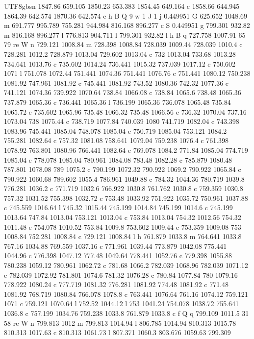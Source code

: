 \documentclass[11pt,a4paper,oneside]{report}
\begin{document}
\begin{CJK*}{UTF8}{gbsn}
{1847.86 659.105 1850.23 653.383 1854.45 649.164 c 1858.66 644.945 1864.39 642.574 1870.36 642.574 c h B Q
9 w 1 J 1 j 0.449951 G 625.652 1048.69 m 691.777 995.789 755.281 944.984 816.168 896.277 c S 0.449951 g
799.301 932.82 m 816.168 896.277 l 776.813 904.711 l 799.301 932.82 l h B q 727.758 1007.91 65 79 re W n
729.121 1008.84 m 728.398 1008.84 728.039 1009.44 728.039 1010.4 c 728.281 1012.2 728.879 1013.04 729.602
1013.04 c 732 1013.04 733.68 1013.28 734.641 1013.76 c 735.602 1014.24 736.441 1015.32 737.039 1017.12 c
750.602 1071 l 751.078 1072.44 751.441 1074.36 751.441 1076.76 c 751.441 1080.12 750.238 1081.92 747.961
1081.92 c 745.441 1081.92 743.52 1080.36 742.32 1077.36 c 741.121 1074.36 739.922 1070.64 738.84 1066.08
c 738.84 1065.6 738.48 1065.36 737.879 1065.36 c 736.441 1065.36 l 736.199 1065.36 736.078 1065.48 735.84
1065.72 c 735.602 1065.96 735.48 1066.32 735.48 1066.56 c 736.32 1070.04 737.16 1073.04 738 1075.44 c
738.719 1077.84 740.039 1080 741.719 1082.04 c 743.398 1083.96 745.441 1085.04 748.078 1085.04 c 750.719
1085.04 753.121 1084.2 755.281 1082.64 c 757.32 1081.08 758.641 1079.04 759.238 1076.4 c 761.398 1078.92
763.801 1080.96 766.441 1082.64 c 769.078 1084.2 771.84 1085.04 774.719 1085.04 c 778.078 1085.04 780.961
1084.08 783.48 1082.28 c 785.879 1080.48 787.801 1078.08 789 1075.2 c 790.199 1072.32 790.922 1069.2
790.922 1065.84 c 790.922 1060.68 789.602 1055.4 786.961 1049.88 c 784.32 1044.36 780.719 1039.8 776.281
1036.2 c 771.719 1032.6 766.922 1030.8 761.762 1030.8 c 759.359 1030.8 757.32 1031.52 755.398 1032.72 c
753.48 1033.92 751.922 1035.72 750.961 1037.88 c 745.559 1016.64 l 745.32 1015.44 745.199 1014.84 745.199
1014.6 c 745.199 1013.64 747.84 1013.04 753.121 1013.04 c 753.84 1013.04 754.32 1012.56 754.32 1011.48 c
754.078 1010.52 753.84 1009.8 753.602 1009.44 c 753.359 1009.08 753 1008.84 752.281 1008.84 c 729.121
1008.84 l h 761.879 1033.8 m 764.641 1033.8 767.16 1034.88 769.559 1037.16 c 771.961 1039.44 773.879
1042.08 775.441 1044.96 c 776.398 1047.12 777.48 1049.64 778.441 1052.76 c 779.398 1055.88 780.238
1059.12 780.961 1062.72 c 781.68 1066.2 782.039 1068.96 782.039 1071.12 c 782.039 1072.92 781.801 1074.6
781.32 1076.28 c 780.84 1077.84 780 1079.16 778.922 1080.24 c 777.719 1081.32 776.281 1081.92 774.48
1081.92 c 771.48 1081.92 768.719 1080.84 766.078 1078.8 c 763.441 1076.64 761.16 1074.12 759.121 1071 c
759.121 1070.64 l 752.52 1044.12 l 753 1041.24 754.078 1038.72 755.641 1036.8 c 757.199 1034.76 759.238
1033.8 761.879 1033.8 c f Q q 799.109 1011.5 31 58 re W n 799.813 1012 m 799.813 1014.94 l 806.785
1014.94 810.313 1015.78 810.313 1017.63 c 810.313 1061.73 l 807.371 1060.3 803.676 1059.63 799.309
}
\end{CJK*}
\end{document}
